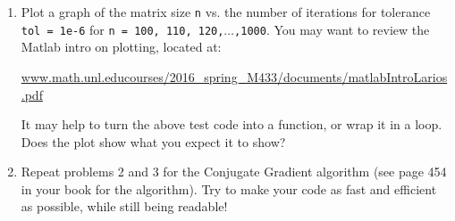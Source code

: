 \documentclass[12pt]{article}
\theoremstyle{plain}
\theoremstyle{definition}
\theoremstyle{remark}
\numberwithin{equation}{section} %
\numberwithin{figure}{section}   %
\begin{document}
\begin{enumerate}
\item Plot a graph of the matrix size \texttt{n} vs. the number of iterations for tolerance \texttt{tol = 1e-6} for \texttt{n = 100, 110, 120,}$\ldots$\texttt{,1000}.  You may want to review the Matlab intro on plotting, located at:

\begin{minipage}[h]{9in}
\hspace{-1in}\url{www.math.unl.educourses/2016_spring_M433/documents/matlabIntroLarios.pdf}
\end{minipage}

It may help to turn the above test code into a function, or wrap it in a loop.  Does the plot show what you expect it to show?  

\item Repeat problems 2 and 3 for the Conjugate Gradient algorithm (see page 454 in your book for the algorithm).  Try to make your code as fast and efficient as possible, while still being readable!

\vspace{1in}





\end{enumerate}
\end{document}
